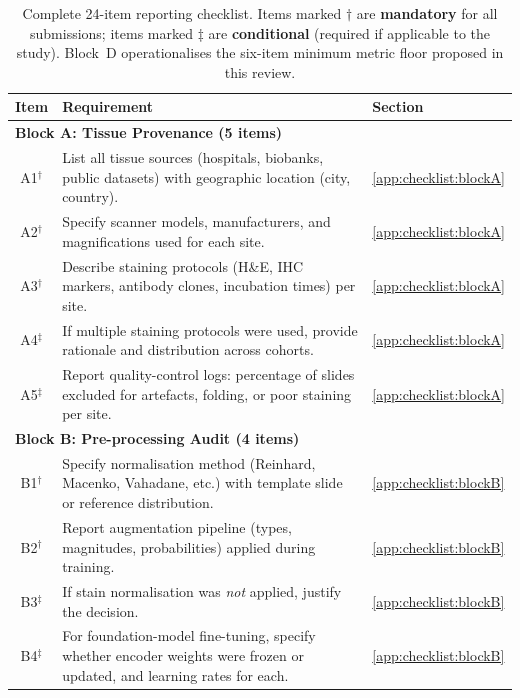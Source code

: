 \begin{table}[htbp]
  \centering
  \caption{Complete 24-item reporting checklist. Items marked $\dagger$ are
           \textbf{mandatory} for all submissions; items marked $\ddagger$ are
           \textbf{conditional} (required if applicable to the study).
           Block~D operationalises the six-item minimum metric floor proposed
           in this review.}
  \label{tab:complete_checklist}
  \small
  \begin{tabularx}{\linewidth}{@{}c p{10.5cm} X@{}}
    \toprule
    \textbf{Item} & \textbf{Requirement} & \textbf{Section} \\
    \midrule
    \multicolumn{3}{l}{\textbf{Block A: Tissue Provenance (5 items)}} \\
    A1$^\dagger$ & List all tissue sources (hospitals, biobanks, public datasets) with geographic location (city, country). & \ref{app:checklist:blockA} \\
    A2$^\dagger$ & Specify scanner models, manufacturers, and magnifications used for each site. & \ref{app:checklist:blockA} \\
    A3$^\dagger$ & Describe staining protocols (H\&E, IHC markers, antibody clones, incubation times) per site. & \ref{app:checklist:blockA} \\
    A4$^\ddagger$ & If multiple staining protocols were used, provide rationale and distribution across cohorts. & \ref{app:checklist:blockA} \\
    A5$^\ddagger$ & Report quality-control logs: percentage of slides excluded for artefacts, folding, or poor staining per site. & \ref{app:checklist:blockA} \\
    \midrule
    \multicolumn{3}{l}{\textbf{Block B: Pre-processing Audit (4 items)}} \\
    B1$^\dagger$ & Specify normalisation method (Reinhard, Macenko, Vahadane, etc.) with template slide or reference distribution. & \ref{app:checklist:blockB} \\
    B2$^\dagger$ & Report augmentation pipeline (types, magnitudes, probabilities) applied during training. & \ref{app:checklist:blockB} \\
    B3$^\ddagger$ & If stain normalisation was \textit{not} applied, justify the decision. & \ref{app:checklist:blockB} \\
    B4$^\ddagger$ & For foundation-model fine-tuning, specify whether encoder weights were frozen or updated, and learning rates for each. & \ref{app:checklist:blockB} \\

\end{tabularx}
\end{table}
